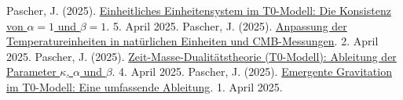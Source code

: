 \documentclass[a4paper,12pt]{article}
\begin{document}
\begin{thebibliography}{99}
		 Pascher, J. (2025). \href{https://github.com/jpascher/T0-Time-Mass-Duality/tree/main/2/pdf/Deutsch/Alpha1Beta1Konsistenz.pdf}{Einheitliches Einheitensystem im T0-Modell: Die Konsistenz von \(\alpha = 1\) und \(\beta = 1\)}. 5. April 2025.
		 Pascher, J. (2025). \href{https://github.com/jpascher/T0-Time-Mass-Duality/tree/main/2/pdf/Deutsch/TempEinheitenCMB.pdf}{Anpassung der Temperatureinheiten in natürlichen Einheiten und CMB-Messungen}. 2. April 2025.
		 Pascher, J. (2025). \href{https://github.com/jpascher/T0-Time-Mass-Duality/tree/main/2/pdf/Deutsch/ZeitMasseT0Params.pdf}{Zeit-Masse-Dualitätstheorie (T0-Modell): Ableitung der Parameter \(\kappa\), \(\alpha\) und \(\beta\)}. 4. April 2025.
		 Pascher, J. (2025). \href{https://github.com/jpascher/T0-Time-Mass-Duality/tree/main/2/pdf/Deutsch/EmergentGravT0.pdf}{Emergente Gravitation im T0-Modell: Eine umfassende Ableitung}. 1. April 2025.
	\end{thebibliography}
	
\end{document}
